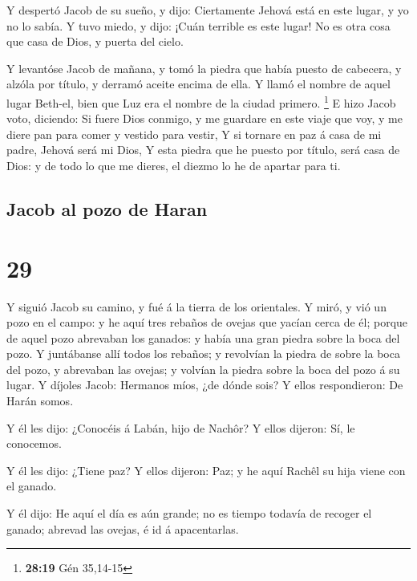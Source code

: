  Y despertó Jacob de su sueño, y dijo: Ciertamente Jehová
está en este lugar, y yo no lo sabía.  Y tuvo miedo, y
dijo: ¡Cuán terrible es este lugar! No es otra cosa que casa de Dios, y
puerta del cielo.

 Y levantóse Jacob de mañana, y tomó la piedra que había
puesto de cabecera, y alzóla por título, y derramó aceite encima de
ella.  Y llamó el nombre de aquel lugar Beth-el, bien que
Luz era el nombre de la ciudad primero. \footnote{\textbf{28:19} Gén
  35,14-15}  E hizo Jacob voto, diciendo: Si fuere Dios
conmigo, y me guardare en este viaje que voy, y me diere pan para comer
y vestido para vestir,  Y si tornare en paz á casa de mi
padre, Jehová será mi Dios,  Y esta piedra que he puesto
por título, será casa de Dios: y de todo lo que me dieres, el diezmo lo
he de apartar para ti.

\hypertarget{jacob-al-pozo-de-haran}{%
\subsection{Jacob al pozo de Haran}\label{jacob-al-pozo-de-haran}}

\hypertarget{section-28}{%
\section{29}\label{section-28}}

 Y siguió Jacob su camino, y fué á la tierra de los
orientales.  Y miró, y vió un pozo en el campo: y he aquí
tres rebaños de ovejas que yacían cerca de él; porque de aquel pozo
abrevaban los ganados: y había una gran piedra sobre la boca del pozo.
 Y juntábanse allí todos los rebaños; y revolvían la
piedra de sobre la boca del pozo, y abrevaban las ovejas; y volvían la
piedra sobre la boca del pozo á su lugar.  Y díjoles
Jacob: Hermanos míos, ¿de dónde sois? Y ellos respondieron: De Harán
somos.

 Y él les dijo: ¿Conocéis á Labán, hijo de Nachôr? Y ellos
dijeron: Sí, le conocemos.

 Y él les dijo: ¿Tiene paz? Y ellos dijeron: Paz; y he
aquí Rachêl su hija viene con el ganado.

 Y él dijo: He aquí el día es aún grande; no es tiempo
todavía de recoger el ganado; abrevad las ovejas, é id á apacentarlas.

